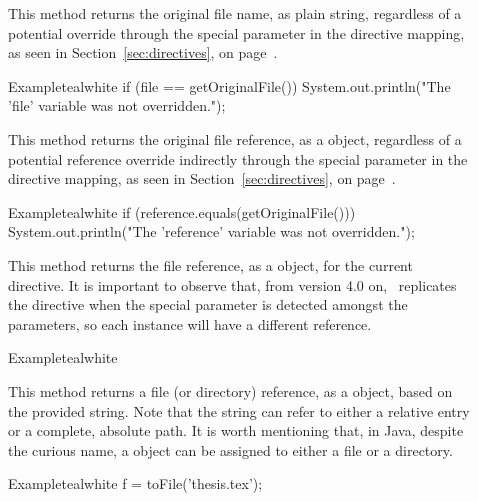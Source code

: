 \begin{description}
\item[] This method returns the original file name, as plain string, regardless of a potential override through the special  parameter in the directive mapping, as seen in Section~\ref{sec:directives}, on page~\pageref{sec:directives}.

\begin{codebox}{Example}{teal}{\icnote}{white}
if (file == getOriginalFile()) {
    System.out.println("The 'file' variable
       was not overridden.");
}
\end{codebox}

\item[] This method returns the original file reference, as a  object, regardless of a potential reference override indirectly through the special  parameter in the directive mapping, as seen in Section~\ref{sec:directives}, on page~\pageref{sec:directives}.

\begin{codebox}{Example}{teal}{\icnote}{white}
if (reference.equals(getOriginalFile())) {
    System.out.println("The 'reference' variable
       was not overridden.");
}
\end{codebox}

\item[] This method returns the file reference, as a  object, for the current directive. It is important to observe that, from version 4.0 on, \arara\ replicates the directive when the special  parameter is detected amongst the parameters, so each instance will have a different reference.

\begin{codebox}{Example}{teal}{\icnote}{white}
\end{codebox}

\item[] This method returns a file (or directory) reference, as a  object, based on the provided string. Note that the string can refer to either a relative entry or a complete, absolute path. It is worth mentioning that, in Java, despite the curious name, a  object can be assigned to either a file or a directory.

\begin{codebox}{Example}{teal}{\icnote}{white}
f = toFile('thesis.tex');
\end{codebox}


\end{description}
